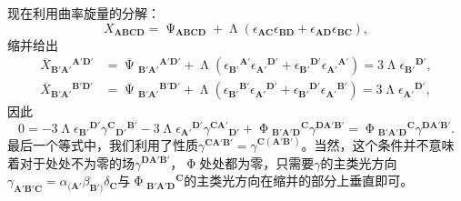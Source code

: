 现在利用曲率旋量的分解：
\begin{equation*}
	X_{\boldsymbol{ABCD}} =\upPsi _{\boldsymbol{ABCD}} +\upLambda (\epsilon _{\boldsymbol{AC}} \epsilon _{\boldsymbol{BD}} +\epsilon _{\boldsymbol{AD}} \epsilon _{\boldsymbol{BC}} ),
\end{equation*}
缩并给出
\begin{equation*}
	\begin{aligned}
		\overline{X}{_{\boldsymbol{B} '\boldsymbol{A} '}}^{\boldsymbol{A'D} '} & =\overline{\upPsi }{_{\boldsymbol{B} '\boldsymbol{A} '}}^{\boldsymbol{A'D} '} +\upLambda (\epsilon {_{\boldsymbol{B} '}}^{\boldsymbol{A} '} \epsilon {_{\boldsymbol{A} '}}^{\boldsymbol{D} '} +\epsilon {_{\boldsymbol{B} '}}^{\boldsymbol{D} '} \epsilon {_{\boldsymbol{A} '}}^{\boldsymbol{A} '} )=3\upLambda \epsilon {_{\boldsymbol{B} '}}^{\boldsymbol{D} '} ,\\
		\overline{X}{_{\boldsymbol{B} '\boldsymbol{A} '}}^{\boldsymbol{B'D} '} & =\overline{\upPsi }{_{\boldsymbol{B} '\boldsymbol{A} '}}^{\boldsymbol{B'D} '} +\upLambda (\epsilon {_{\boldsymbol{B} '}}^{\boldsymbol{B} '} \epsilon {_{\boldsymbol{A} '}}^{\boldsymbol{D} '} +\epsilon {_{\boldsymbol{B} '}}^{\boldsymbol{D} '} \epsilon {_{\boldsymbol{A} '}}^{\boldsymbol{B} '} )=3\upLambda \epsilon {_{\boldsymbol{A} '}}^{\boldsymbol{D} '} ,
	\end{aligned}
\end{equation*}
因此
\begin{equation*}
	0=-3\upLambda \epsilon {_{\boldsymbol{B} '}}^{\boldsymbol{D} '} \gamma ^{\boldsymbol{C}}{}{_{\boldsymbol{D} '}}^{\boldsymbol{B} '} -3\upLambda \epsilon {_{\boldsymbol{A} '}}^{\boldsymbol{D} '} \gamma ^{\boldsymbol{CA} '}{}_{\boldsymbol{D} '} +\upPhi {_{\boldsymbol{B'A'D}}}^{\boldsymbol{C}} \gamma ^{\boldsymbol{DA} '\boldsymbol{B} '} =\upPhi {_{\boldsymbol{B'A'D}}}^{\boldsymbol{C}} \gamma ^{\boldsymbol{DA} '\boldsymbol{B} '} .
\end{equation*}
最后一个等式中，我们利用了性质$\gamma ^{\boldsymbol{CA} '\boldsymbol{B} '} =\gamma ^{\boldsymbol{C}(\boldsymbol{A} '\boldsymbol{B} ')}$。当然，这个条件并不意味着对于处处不为零的场$\gamma ^{\boldsymbol{DA} '\boldsymbol{B} '}$，$\upPhi $处处都为零，只需要$\gamma $的主类光方向$\gamma _{\boldsymbol{A} '\boldsymbol{B} '\boldsymbol{C}} =\alpha _{(\boldsymbol{A} '} \beta _{\boldsymbol{B} ')} \delta _{\boldsymbol{C}}$与$\upPhi {_{\boldsymbol{B'A'D}}}^{\boldsymbol{C}}$的主类光方向在缩并的部分上垂直即可。



